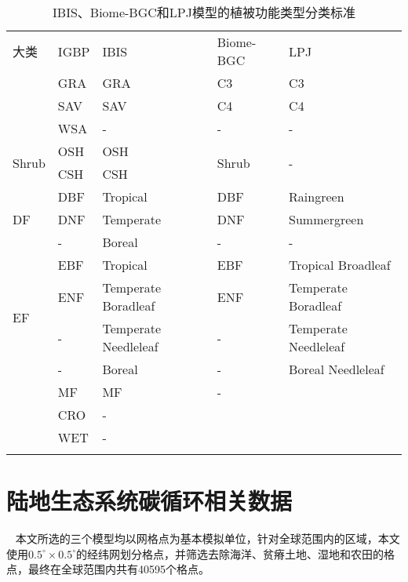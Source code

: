 \begin{table}[H]
    \centering
    \caption{IBIS、Biome-BGC和LPJ模型的植被功能类型分类标准}
    \label{tab:PFTs}
    \begin{threeparttable}
        \begin{tabular}{lllll}
            \Xhline{1.5pt}
            大类 & IGBP & IBIS & Biome-BGC & LPJ \\
            \Xhline{1.5pt}
            \multirow{3}{*}{Grass} & GRA & GRA & C3 & C3 \\
            & SAV & SAV & C4 & C4 \\
            & WSA & - & - & - \\
            \hline
            \multirow{2}{*}{Shrub} & OSH & OSH & \multirow{2}{*}{Shrub} & \multirow{2}{*}{-} \\
            & CSH & CSH & & \\
            \hline
            \multirow{3}{*}{DF} & DBF & Tropical & DBF & Raingreen \\
             & DNF & Temperate & DNF & Summergreen \\
             & - & Boreal & - & - \\
             \hline
            \multirow{4}{*}{EF} & EBF & Tropical & EBF & Tropical Broadleaf \\
             & ENF & Temperate Boradleaf & ENF & Temperate Boradleaf \\
             & - & Temperate Needleleaf & - & Temperate Needleleaf \\
             & - & Boreal & - & Boreal Needleleaf \\
             \hline
             & MF & MF & - & \\
             \hline
             & CRO & - & & \\
             \hline
             & WET & - & & \\
            \Xhline{1.5pt}
        \end{tabular}
    \end{threeparttable}
\end{table}

\section{陆地生态系统碳循环相关数据}
~\label{sec:model-data}
本文所选的三个模型均以网格点为基本模拟单位，针对全球范围内的区域，本文使用$0.5^{\circ} \times 0.5^{\circ}$的经纬网划分格点，并筛选去除海洋、贫瘠土地、湿地和农田的格点，最终在全球范围内共有40595个格点。

